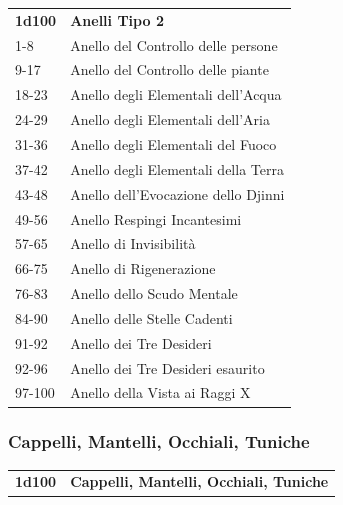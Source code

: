 \begin{multicols}{2}
\begin{tabular}{ll}
\textbf{1d100} & \textbf{Anelli Tipo 2}\\
1-8 &  Anello del Controllo delle persone\\
9-17&  Anello del Controllo delle piante\\
18-23& Anello degli Elementali dell'Acqua\\
24-29& Anello degli Elementali dell'Aria\\
31-36& Anello degli Elementali del Fuoco\\
37-42& Anello degli Elementali della Terra\\
43-48& Anello dell'Evocazione dello Djinni\\
49-56& Anello Respingi Incantesimi\\
57-65& Anello di Invisibilità\\
66-75& Anello di Rigenerazione\\
76-83& Anello dello Scudo Mentale\\
84-90& Anello delle Stelle Cadenti\\
91-92& Anello dei Tre Desideri\\
92-96& Anello dei Tre Desideri esaurito\\
97-100 & Anello della Vista ai Raggi X\\

\end{tabular}


\subsubsection{Cappelli, Mantelli, Occhiali, Tuniche}

\begin{tabularx}{0.45\textwidth}{lX}
\textbf{1d100} & \textbf{Cappelli, Mantelli, Occhiali, Tuniche}\\


\end{tabularx}
\end{multicols}

